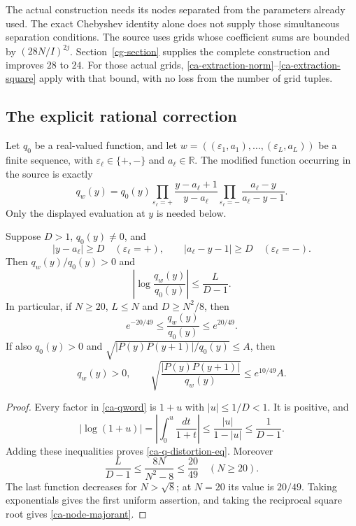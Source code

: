 The actual construction needs its nodes separated from the
parameters already used.  The exact Chebyshev identity alone
does not supply those simultaneous separation conditions.
The source uses grids whose coefficient sums are bounded
by $(28N/I)^{2j}$.  Section~\ref{cg-section} supplies the
complete construction and improves $28$ to $24$.
For those actual grids,
\eqref{ca-extraction-norm}--\eqref{ca-extraction-square}
apply with that bound, with no loss from the number of grid
tuples.

\subsection{The explicit rational correction}

Let $q_0$ be a real-valued function, and let
$w=((\varepsilon_1,a_1),\ldots,(\varepsilon_L,a_L))$
be a finite sequence, with $\varepsilon_\ell\in\{+,-\}$
and $a_\ell\in\mathbb R$.  The modified function occurring
in the source is exactly
\begin{equation}\label{ca-qword}
 q_w(y)=q_0(y)
   \prod_{\varepsilon_\ell=+}
           \frac{y-a_\ell+1}{y-a_\ell}
   \prod_{\varepsilon_\ell=-}
           \frac{a_\ell-y}{a_\ell-y-1}.
\end{equation}
Only the displayed evaluation at $y$ is needed below.

\begin{lemma}\label{ca-q-distortion}
Suppose $D>1$, $q_0(y)\ne0$, and
\[
 |y-a_\ell|\geq D\quad(\varepsilon_\ell=+),\qquad
 |a_\ell-y-1|\geq D\quad(\varepsilon_\ell=-).
\]
Then $q_w(y)/q_0(y)>0$ and
\begin{equation}\label{ca-q-distortion-eq}
 \left|\log\frac{q_w(y)}{q_0(y)}\right|
                      \leq\frac{L}{D-1}.
\end{equation}
In particular, if $N\geq20$, $L\leq N$ and $D\geq N^2/8$,
then
\[
 e^{-20/49}\leq\frac{q_w(y)}{q_0(y)}\leq e^{20/49}.
\]
If also $q_0(y)>0$ and
$\sqrt{|P(y)P(y+1)|/q_0(y)}\leq A$, then
\begin{equation}\label{ca-node-majorant}
 q_w(y)>0,\qquad
 \sqrt{\frac{|P(y)P(y+1)|}{q_w(y)}}
                                      \leq e^{10/49}A.
\end{equation}
\end{lemma}

\begin{proof}
Every factor in \eqref{ca-qword} is $1+u$ with
$|u|\leq1/D<1$.  It is positive, and
\[
 |\log(1+u)|
  =\left|\int_0^u\frac{dt}{1+t}\right|
  \leq\frac{|u|}{1-|u|}\leq\frac1{D-1}.
\]
Adding these inequalities proves
\eqref{ca-q-distortion-eq}.
Moreover
\[
 \frac{L}{D-1}\leq\frac{8N}{N^2-8}
                          \leq\frac{20}{49}\quad(N\geq20).
\]
The last function decreases for $N>\sqrt8$; at $N=20$
its value is $20/49$.
Taking exponentials gives the first uniform assertion,
and taking the reciprocal square root gives
\eqref{ca-node-majorant}.
\end{proof}

